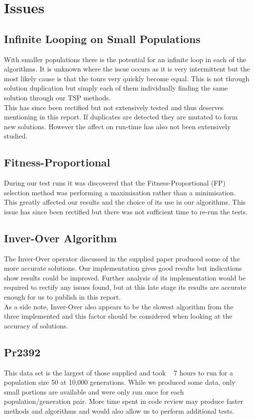 \documentclass[a4paper,12pt]{article}
\begin{document}
\newpage
\section{Issues}

\subsection{Infinite Looping on Small Populations}
With smaller populations there is the potential for an infinite loop in each of the algorithms. It is unknown where the issue occurs as it is very intermittent but the most likely cause is that the tours very quickly become equal. This is not through solution duplication but simply each of them individually finding the same solution through our TSP methods.\\

This has since been rectified but not extensively tested and thus deserves mentioning in this report. If duplicates are detected they are mutated to form new solutions. However the affect on run-time has also not been extensively studied.

\subsection{Fitness-Proportional}
During our test runs it was discovered that the Fitness-Proportional (FP) selection method was performing a maximisation rather than a minimisation. This  greatly affected our results and the choice of its use in our algorithms. This issue has since been rectified but there was not sufficient time to re-run the tests.

\subsection{Inver-Over Algorithm}
The Inver-Over operator discussed in the supplied paper produced some of the more accurate solutions. Our implementation gives good results but indications show results could be improved. Further analysis of its implementation would be required to rectify any issues found, but at this late stage its results are accurate enough for us to publish in this report.\\

As a side note, Inver-Over also appears to be the slowest algorithm from the three implemented and this factor should be considered when looking at the accuracy of solutions.

\subsection{Pr2392}
This data set is the largest of those supplied and took ~ 7 hours to run for a population size 50 at 10,000 generations. While we produced some data, only small portions are available and were only run once for each population/generation pair. More time spent in code review may produce faster methods and algorithms and would also allow us to perform additional tests.
\end{document}
